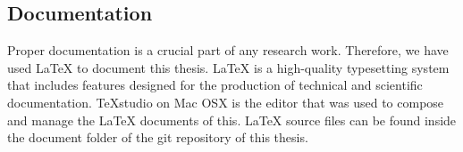 \subsection{Documentation} Proper documentation is a crucial part of any research work. Therefore, we have used LaTeX to document this thesis. LaTeX is a high-quality typesetting system that includes features designed for the production of technical and scientific documentation. TeXstudio on Mac OSX is the editor that was used to compose and manage the LaTeX documents of this. LaTeX source files can be found inside the document folder of the git repository of this thesis.